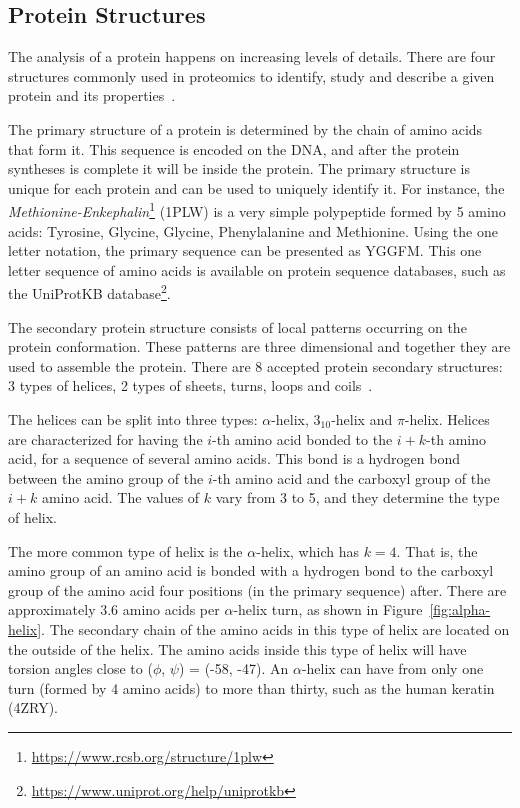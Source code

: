 \subsection{Protein Structures}
\label{sec:protein-structures}

The analysis of a protein happens on increasing levels of details. There are four structures commonly used in proteomics to identify, study and describe a given protein and its properties~\cite{tsai2003introduction}.

The primary structure of a protein is determined by the chain of amino acids that form it. This sequence is encoded on the \ac{DNA}, and after the protein syntheses is complete it will be inside the protein. The primary structure is unique for each protein and can be used to uniquely identify it. For instance, the \textit{Methionine-Enkephalin}\footnote{\url{https://www.rcsb.org/structure/1plw}} (1PLW) is a very simple polypeptide formed by 5 amino acids: Tyrosine, Glycine, Glycine, Phenylalanine and Methionine. Using the one letter notation, the primary sequence can be presented as YGGFM. This one letter sequence of amino acids is available on protein sequence databases, such as the UniProtKB database\footnote{\url{https://www.uniprot.org/help/uniprotkb}}.

The secondary protein structure consists of local patterns occurring on the protein conformation. These patterns are three dimensional and together they are used to assemble the protein. There are 8 accepted protein secondary structures: 3 types of helices, 2 types of sheets, turns, loops and coils~\cite{geourjon1995sopma}.

The helices can be split into three types: $\alpha$-helix, $3_{10}$-helix and $\pi$-helix. Helices are characterized for having the $i$-th amino acid bonded to the $i+k$-th amino acid, for a sequence of several amino acids. This bond is a hydrogen bond between the amino group of the $i$-th amino acid and the carboxyl group of the $i+k$ amino acid. The values of $k$ vary from 3 to 5, and they determine the type of helix.

The more common type of helix is the $\alpha$-helix, which has $k=4$. That is, the amino group of an amino acid is bonded with a hydrogen bond to the carboxyl group of the amino acid four positions (in the primary sequence) after. There are approximately $3.6$ amino acids per $\alpha$-helix turn, as shown in Figure~\ref{fig:alpha-helix}. The secondary chain of the amino acids in this type of helix are located on the outside of the  helix. The amino acids inside this type of helix will have torsion angles close to ($\phi$, $\psi$) = (-58, -47). An $\alpha$-helix can have from only one turn (formed by 4 amino acids) to more than thirty, such as the human keratin (4ZRY).

